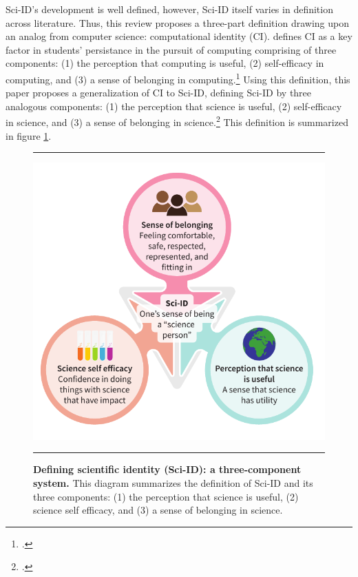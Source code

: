 \documentclass[10pt, twocolumn]{article}
\begin{document}
        Sci-ID's development is well defined, however, Sci-ID itself varies in definition across literature. Thus, this review proposes a three-part definition drawing upon an analog from computer science: computational identity (CI). \cite{brousseau_position_2019} defines CI as a key factor in students' persistance in the pursuit of computing comprising of three components: (1) the perception that computing is useful, (2) self-efficacy in computing, and (3) a sense of belonging in computing.\footcite{brousseau_position_2019} Using this definition, this paper proposes a generalization of CI to Sci-ID, defining Sci-ID by three analogous components: (1) the perception that science is useful, (2) self-efficacy in science, and (3) a sense of belonging in science.\footcite{brousseau_position_2019} This definition is summarized in figure \ref{fig:sci_id}.

        \begin{figure}[h]
            \rule{\columnwidth}{1pt}
            \begin{center}
            \includegraphics[width = \columnwidth]{figures/sci-id.pdf}
            \end{center}
            \caption{\textbf{Defining scientific identity (Sci-ID): a three-component system.} This diagram summarizes the definition of Sci-ID and its three components: (1) the perception that science is useful, (2) science self efficacy, and (3) a sense of belonging in science.}
            \label{fig:sci_id}
            \rule{\columnwidth}{1pt}
        \end{figure}
\end{document}
